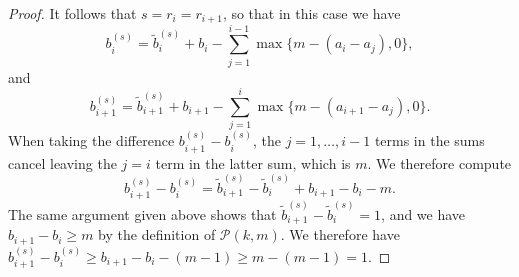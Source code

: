 \documentclass[12pt]{amsart}
\numberwithin{equation}{section}
\theoremstyle{definition}
\begin{document}
\begin{proof}
    It follows that $s = r_i=r_{i+1}$, so that in this case we have
    \[ b^{(s)}_i = \tilde{b}^{(s)}_i + b_i- \sum_{j=1}^{i-1}\max\{m-(a_i-a_j),0\}, \]
    and 
    \[ b^{(s)}_{i+1} = \tilde{b}^{(s)}_{i+1} + b_{i+1}- \sum_{j=1}^{i}\max\{m-(a_{i+1}-a_j),0\}. \]
    When taking the difference $b^{(s)}_{i+1}-b^{(s)}_i$, the $j=1,\dots,i-1$ terms in the sums cancel leaving the $j=i$ term in the latter sum, which is $m$. We therefore compute
    \[ b^{(s)}_{i+1}-b^{(s)}_i = \tilde{b}^{(s)}_{i+1}-\tilde{b}^{(s)}_i+b_{i+1}-b_i-m. \]
    The same argument given above shows that $\tilde{b}^{(s)}_{i+1}-\tilde{b}^{(s)}_i = 1$, and we have $b_{i+1}-b_i\geq m$ by the definition of $\mathcal{P}(k,m)$. We therefore have $b^{(s)}_{i+1}-b^{(s)}_i \geq b_{i+1}-b_i-(m-1)\geq m-(m-1) = 1$. 
\end{proof}
\end{document}
